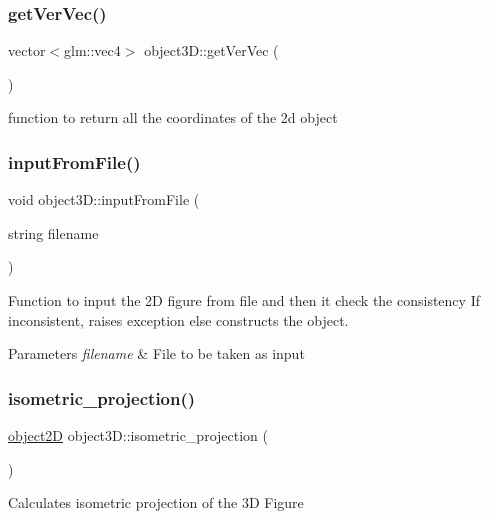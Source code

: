 \subsubsection{\texorpdfstring{get\+Ver\+Vec()}{getVerVec()}}
{\footnotesize\ttfamily vector$<$glm\+::vec4$>$ object3\+D\+::get\+Ver\+Vec (\begin{DoxyParamCaption}{ }\end{DoxyParamCaption})}

function to return all the coordinates of the 2d object \mbox{\label{classobject3D_ab9f47d0de463217dd4cc816d16bf1661}} 
\subsubsection{\texorpdfstring{input\+From\+File()}{inputFromFile()}}
{\footnotesize\ttfamily void object3\+D\+::input\+From\+File (\begin{DoxyParamCaption}\item[{string}]{filename }\end{DoxyParamCaption})}

Function to input the 2D figure from file and then it check the consistency If inconsistent, raises exception else constructs the object. 
\begin{DoxyParams}{Parameters}
{\em filename} & File to be taken as input \\
\hline
\end{DoxyParams}
\mbox{\label{classobject3D_a18f7b37e4d847917835205c9faf0885e}} 
\subsubsection{\texorpdfstring{isometric\+\_\+projection()}{isometric\_projection()}}
{\footnotesize\ttfamily \mbox{\hyperlink{classobject2D}{object2D}} object3\+D\+::isometric\+\_\+projection (\begin{DoxyParamCaption}{ }\end{DoxyParamCaption})}

Calculates isometric projection of the 3D Figure \mbox{\label{classobject3D_a7bb948cdf51a8143338bb8a22e97f910}} 
